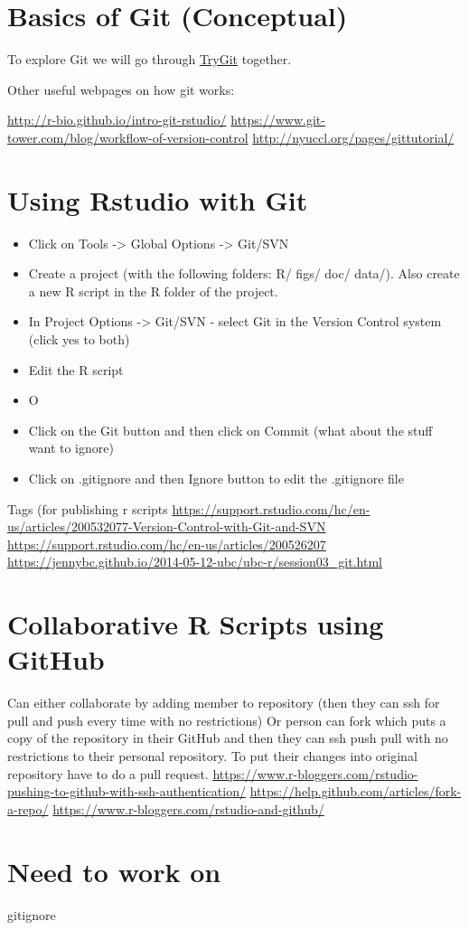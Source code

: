 \documentclass[12pt,letterpaper]{article} %
\begin{document}
\section*{Basics of Git (Conceptual)}
To explore Git we will go through \href{https://try.github.io/levels/1/challenges/1}{TryGit} together.

Other useful webpages on how git works:

\url{http://r-bio.github.io/intro-git-rstudio/}
\url{https://www.git-tower.com/blog/workflow-of-version-control}
\url{http://nyuccl.org/pages/gittutorial/}


\section*{Using Rstudio with Git}
\begin{itemize}
\item Click on Tools -> Global Options -> Git/SVN
\item Create a project (with the following folders: R/ figs/ doc/ data/). Also create a new R script in the R folder of the project.
\item In Project Options -> Git/SVN - select Git in the Version Control system (click yes to both)
\item Edit the R script
\item O
\item Click on the Git button and then click on Commit (what about the stuff want to ignore)
\item Click on .gitignore and then Ignore button to edit the .gitignore file
\end{itemize}

Tags (for publishing r scripts
\url{https://support.rstudio.com/hc/en-us/articles/200532077-Version-Control-with-Git-and-SVN}
\url{https://support.rstudio.com/hc/en-us/articles/200526207}
\url{https://jennybc.github.io/2014-05-12-ubc/ubc-r/session03_git.html}


\section*{Collaborative R Scripts using GitHub}
Can either collaborate by adding member to repository (then they can ssh for pull and push every time with no restrictions)
Or person can fork which puts a copy of the repository in their GitHub and then they can ssh push pull with no restrictions to their personal repository. To put their changes into original repository have to do a pull request.
\url{https://www.r-bloggers.com/rstudio-pushing-to-github-with-ssh-authentication/}
\url{https://help.github.com/articles/fork-a-repo/}
\url{https://www.r-bloggers.com/rstudio-and-github/}
\section*{Need to work on}
gitignore
\end{document}

